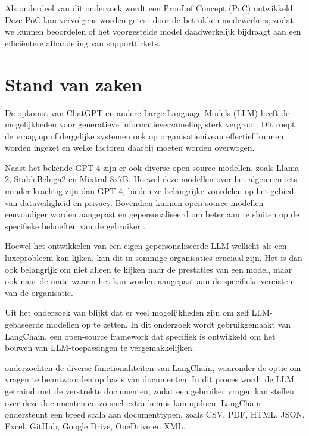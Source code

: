 Als onderdeel van dit onderzoek wordt een Proof of Concept (PoC) ontwikkeld. Deze PoC kan vervolgens worden getest door de betrokken medewerkers, zodat we kunnen beoordelen of het voorgestelde model daadwerkelijk bijdraagt aan een efficiëntere afhandeling van supporttickets.


\section{Stand van zaken}%
\label{sec:stand van zaken}

De opkomst van ChatGPT en andere Large Language Models (LLM) heeft de mogelijkheden voor generatieve informatieverzameling sterk vergroot. Dit roept de vraag op of dergelijke systemen ook op organisatieniveau effectief kunnen worden ingezet en welke factoren daarbij moeten worden overwogen.

Naast het bekende GPT-4 zijn er ook diverse open-source modellen, zoals Llama 2, StableBeluga2 en Mixtral 8x7B. Hoewel deze modellen over het algemeen iets minder krachtig zijn dan GPT-4, bieden ze belangrijke voordelen op het gebied van dataveiligheid en privacy. Bovendien kunnen open-source modellen eenvoudiger worden aangepast en gepersonaliseerd om beter aan te sluiten op de specifieke behoeften van de gebruiker \autocite{KernanFreire2024}.

Hoewel het ontwikkelen van een eigen gepersonaliseerde LLM wellicht als een luxeprobleem kan lijken, kan dit in sommige organisaties cruciaal zijn. Het is dan ook belangrijk om niet alleen te kijken naar de prestaties van een model, maar ook naar de mate waarin het kan worden aangepast aan de specifieke vereisten van de organisatie.

Uit het onderzoek van \textcite{Topsakal2023} blijkt dat er veel mogelijkheden zijn om zelf LLM-gebaseerde modellen op te zetten. In dit onderzoek wordt gebruikgemaakt van LangChain, een open-source framework dat specifiek is ontwikkeld om het bouwen van LLM-toepassingen te vergemakkelijken.

\textcite{Topsakal2023} onderzochten de diverse functionaliteiten van LangChain, waaronder de optie om vragen te beantwoorden op basis van documenten. In dit proces wordt de LLM getraind met de verstrekte documenten, zodat een gebruiker vragen kan stellen over deze documenten en zo snel extra kennis kan opdoen. LangChain ondersteunt een breed scala aan documenttypen, zoals CSV, PDF, HTML, JSON, Excel, GitHub, Google Drive, OneDrive en XML.


